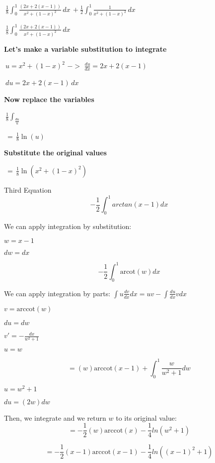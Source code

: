\documentclass{article}
\begin{document}
\bigskip $\ \frac{1}{8} \int_{0}^{1} \frac{(2x+2(x-1))}{x^2+(1-x)^2}\,dx\, + \frac{1}{2} \int_{0}^{1}\frac{1}{x^2+(1-x)^2} \,dx \,$\ 

\bigskip

\bigskip $\ \frac{1}{8} \int_{0}^{1} \frac{(2x+2(x-1))}{x^2+(1-x)^2}\,dx\,$\ 

\bigskip \textbf{Let's make a variable substitution to integrate} 

\bigskip $\ u=x^2+(1-x)^2 \,\,->\,\, \frac {du}{dx}= 2x+2(x-1) \,\,$\ 

\bigskip $\ du=2x+2(x-1) \,dx\,$\

\bigskip \textbf{Now replace the variables} 

\bigskip $\ \frac{1}{8} \int_ \frac {du}{u} $\

\bigskip $\ = \, \frac{1}{8} \ln (u) $\

\bigskip \textbf{Substitute the original values}

\bigskip $\ = \, \frac{1}{8} \ln (x^2+(1-x)^2)  $


Third Equation
\begin{equation*}
   -\frac{1}{2}\int_{0}^{1} arctan(x-1)dx
\end{equation*}

We can apply integration by substitution:
\begin{list}{}{}
       \item $w=x-1$  
       \item $dw=dx$
\end{list}

\begin{equation*}
   -\frac{1}{2}\int_{0}^{1}\textrm{arcot}(w)dx
\end{equation*}

We can apply integration by parts: $\int {u\frac{{dv}}{{dx}}} dx = uv - \int {\frac{{du}}{{dx}}} vdx$ 
\begin{list}{}{}
       \item $v=\textrm{arccot}(w)$
       \item $du = dw$
       \item $v'=-\frac{dx}{w^2+1}
$
       \item $u=w$
\end{list}

\begin{equation*}
   =(w)\textrm{arccot}(x-1)+\int_{0}^{1}\frac{w}{w^2+1}dw
\end{equation*}
\begin{list}{}{}
       \item $u=w^2+1$
       \item $du=(2w)dw$
\end{list}

Then, we integrate and we return $w$ to its original value:
\begin{equation*}
   =-\frac{1}{2}(w)\textrm{arccot}(x)-\frac{1}{4}ln(w^2+1)
\end{equation*}

\begin{equation*}
   =-\frac{1}{2}(x-1)\textrm{arccot}(x-1)-\frac{1}{4}ln((x-1)^2+1)
\end{equation*}
\end{document}
